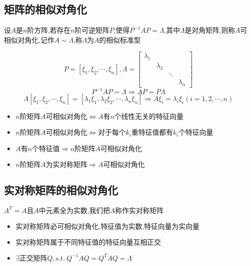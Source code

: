 \subsection{矩阵的相似对角化}
\begin{definition}[相似对角化]
	设$A$是$n$阶方阵,若存在$n$阶可逆矩阵$P$,使得$P^{-1}AP=\varLambda$,其中$\varLambda$是对角矩阵,则称$A$可相似对角化,记作$A\sim \varLambda$,称$\varLambda$为$A$的相似标准型
	
	\begin{anymark}[注]
		$$P=[\xi_{1},\xi_{2},\cdots,\xi_{n}],\varLambda=\left[
		\begin{matrix}
			\lambda_{1}& & & \\
			&\lambda_{2}& & \\
			& &\ddots &\\
			& & &\lambda_{n}
		\end{matrix}
		\right]$$
		$$P^{-1}AP=\varLambda\Rightarrow AP=P\varLambda$$
		$$A[\xi_{1},\xi_{2},\cdots,\xi_{n}]=[\lambda_{1}\xi_{1},\lambda_{2}\xi_{2},\cdots,\lambda_{n}\xi_{n}]\Rightarrow A\xi_{i}=\lambda_{i}\xi_{i}(i=1,2,\cdots,n)$$
	\end{anymark}
	\begin{corollary}[对角化]
		\begin{itemize}
			\item $n\text{阶矩阵}A\text{可相似对角化}\Leftrightarrow A\text{有}n\text{个线性无关的特征向量}$
			\item $n\text{阶矩阵}A\text{可相似对角化}\Leftrightarrow \text{对于每个}k_{i}\text{重特征值都有}k_{i}\text{个特征向量}$
			\item $A\text{有}n\text{个特征值}\Rightarrow n\text{阶矩阵}A\text{可相似对角化}$
			\item $n\text{阶矩阵}A\text{为实对称矩阵}\Rightarrow A\text{可相似对角化}$
		\end{itemize}
	\end{corollary}
\end{definition}
\subsection{实对称矩阵的相似对角化}
\begin{definition}[实对称矩阵相似对角化]
	$A^{T}=A\text{且}A\text{中元素全为实数,我们把}A\text{称作实对称矩阵}$
	
	\begin{anymark}[性质]
		\begin{itemize}
			\item $\text{实对称矩阵必可相似对角化,特征值为实数,特征向量为实向量}$
			\item $\text{实对称矩阵属于不同特征值的特征向量互相正交}$
			\item $\exists \text{正交矩阵} Q,\text{s.t.}\ Q^{-1}AQ=Q^{T}AQ=\varLambda$
		\end{itemize}
	\end{anymark}
\end{definition}

